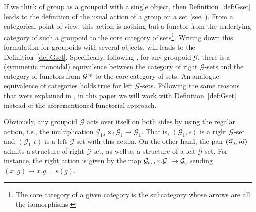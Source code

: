 \documentclass[11pt]{article}
\numberwithin{equation}{section}
\newcommand{\Go}{\cG_{\Sscript{0}}}
\newcommand{\Ga}{\cG_{\Sscript{1}}}
\newcommand{\cG}{{\mathcal G}}
\newcommand{\Sscript}[1]{\scriptscriptstyle{#1}}
\newcommand{\due}[3]{{}_{{#2 }} {#1}_{{ #3}} }
\begin{document}
\begin{Remark}\label{rem:GrpdSets}If we think of group as a groupoid with a single object, then Definition~\ref{def:Gset} leads to the definition of the usual action of a group on a set (see~\cite{Bouc:2010}). From a categorical point of view, this action is nothing but a functor from the underlying category of such a groupoid to the core category of sets\footnote{The core category of a given category is the subcategory whose arrows are all the isomorphisms.}. Writing down this formulation for groupoids with several objects, will leads to the Definition~\ref{def:Gset}. Specifically, following \cite[Remark~2.6]{Kaoutit/Spinosa:2018}, for any groupoid $\cG$, there is a (symmetric monoidal) equivalence between the category of right $\cG$-sets and the category of functors from $\cG^{\Sscript{\rm op}}$ to the core category of sets. An analogue equivalence of categories holds true for left $\cG$-sets. Following the same reasons that were explained in \cite[Remark 2.6, Section~5.3]{Kaoutit/Spinosa:2018}, in this paper we will work with Definition~\ref{def:Gset} instead of the aforementioned functorial approach.
\end{Remark}

Obviously, any groupoid $\cG$ acts over itself on both sides by using the regular action, i.e., the multiplication $\Ga \due \times {\Sscript{{s}}} { \Sscript{{t}}} \Ga \to \Ga$. That is, $(\Ga, {s})$ is a right $\cG$-set and $(\Ga, {t})$ is a left $\cG$-set with this action. On the other hand, the pair $(\Go, {\rm id})$ admits a structure of right $\cG$-set, as well as a structure of a left $\cG$-set. For instance, the right action is given by the map $\Go \due \times {\Sscript{{\rm id}}} { \Sscript{{t}}} \Ga \to \Go$ sending $(x,g) \mapsto x . g= s(g)$.
\end{document}
